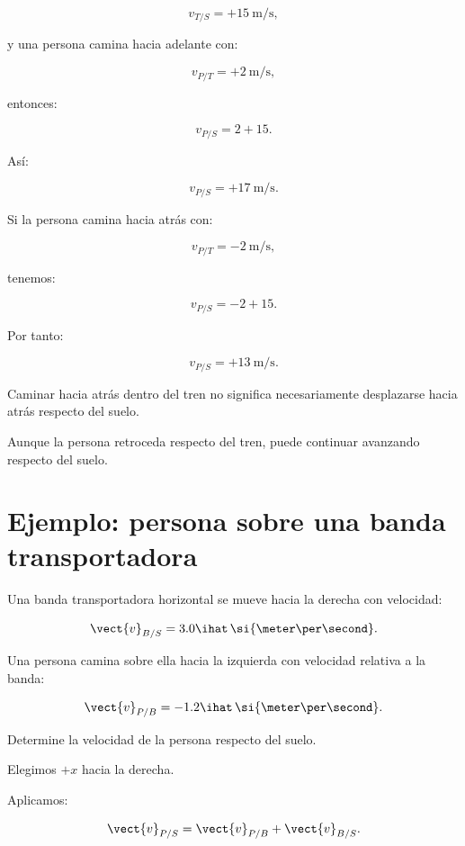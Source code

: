 \[
v_{T/S}=+\SI{15}{\meter\per\second},
\]

y una persona camina hacia adelante con:

\[
v_{P/T}=+\SI{2}{\meter\per\second},
\]

entonces:

\[
v_{P/S}=2+15.
\]

Así:

\[
\boxed{
v_{P/S}=+\SI{17}{\meter\per\second}
}.
\]

Si la persona camina hacia atrás con:

\[
v_{P/T}=-\SI{2}{\meter\per\second},
\]

tenemos:

\[
v_{P/S}=-2+15.
\]

Por tanto:

\[
\boxed{
v_{P/S}=+\SI{13}{\meter\per\second}
}.
\]

\begin{interpretacion}

Caminar hacia atrás dentro del tren no significa
necesariamente desplazarse hacia atrás respecto del suelo.

Aunque la persona retroceda respecto del tren,
puede continuar avanzando respecto del suelo.

\end{interpretacion}


\section{Ejemplo: persona sobre una banda transportadora}

\begin{ejemplo}

Una banda transportadora horizontal se mueve hacia
la derecha con velocidad:

\[
\vect{v}_{B/S}
=
3.0\ihat\,
\si{\meter\per\second}.
\]

Una persona camina sobre ella hacia la izquierda
con velocidad relativa a la banda:

\[
\vect{v}_{P/B}
=
-1.2\ihat\,
\si{\meter\per\second}.
\]

Determine la velocidad de la persona respecto del suelo.

\end{ejemplo}

Elegimos \(+x\) hacia la derecha.

Aplicamos:

\[
\vect{v}_{P/S}
=
\vect{v}_{P/B}
+
\vect{v}_{B/S}.
\]


